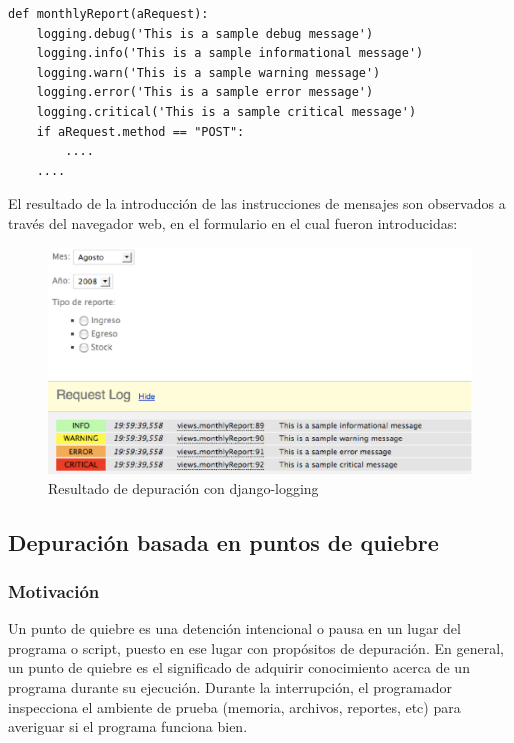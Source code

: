 \documentclass[12pt,legalpaper]{report}
\begin{document}
\begin{singlespace}
\begin{lstlisting}[style=Python]
def monthlyReport(aRequest):
    logging.debug('This is a sample debug message')
    logging.info('This is a sample informational message')
    logging.warn('This is a sample warning message')
    logging.error('This is a sample error message')
    logging.critical('This is a sample critical message')    
    if aRequest.method == "POST":
    	....
    ....
\end{lstlisting}
\end{singlespace}

El resultado de la introducción de las instrucciones de mensajes son observados a través del navegador web, en el formulario en el cual fueron introducidas:

\begin{figure}[hpb]
	\centering
	\includegraphics[scale=0.5]{images/django-logging.eps}
	\caption{Resultado de depuración con django-logging}
\end{figure}
 

		\subsection{Depuración basada en puntos de quiebre}
			\subsubsection{Motivación}

Un punto de quiebre es una detención intencional o pausa en un lugar del programa o script, puesto en ese lugar con propósitos de depuración.  En general, un punto de quiebre es el significado de adquirir conocimiento acerca de un programa durante su ejecución.  Durante la interrupción, el programador inspecciona el ambiente de prueba (memoria, archivos, reportes, etc) para averiguar si el programa funciona bien.
\end{document}
